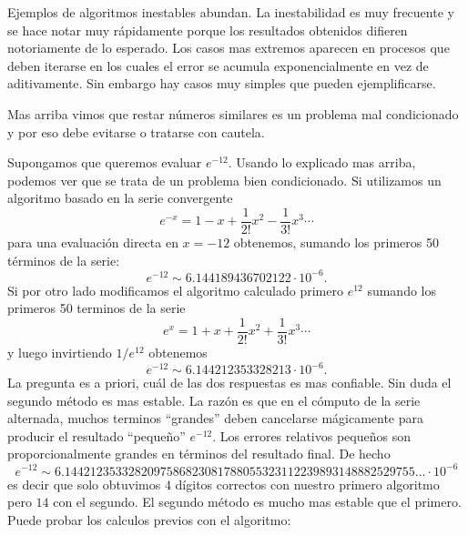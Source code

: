 Ejemplos de algoritmos inestables abundan. La inestabilidad es muy frecuente y se hace notar muy rápidamente porque los resultados obtenidos difieren notoriamente de lo esperado. Los casos mas extremos aparecen en procesos que deben iterarse en los cuales el error se acumula exponencialmente en vez de aditivamente. Sin embargo hay casos muy simples que pueden ejemplificarse.


Mas arriba vimos que restar números similares es un problema mal condicionado y por eso debe evitarse o tratarse con cautela.

Supongamos que queremos evaluar $e^{-12}$. Usando lo explicado mas arriba, podemos ver que se trata de un problema bien condicionado.  Si utilizamos un algoritmo basado en la serie convergente
$$
e^{-x}=1-x+\frac{1}{2!}x^2-\frac{1}{3!}x^3\cdots
$$
para una evaluación directa en $x=-12$ obtenemos, sumando los primeros 50 términos de la serie:
$$
e^{-12}\sim 6.144189436702122\cdot 10^{-6}.$$
Si por otro lado modificamos el algoritmo calculado primero $e^{12}$
sumando los primeros 50 terminos de la serie
$$
e^{x}=1+x+\frac{1}{2!}x^2+\frac{1}{3!}x^3\cdots
$$
y luego invirtiendo $1/e^{12}$ obtenemos
$$e^{-12}\sim 6.144212353328213\cdot 10^{-6}.$$
La pregunta es a priori, cuál de las dos respuestas es mas confiable. Sin duda el segundo método es mas estable. La razón es que en el cómputo de la serie alternada, muchos terminos ``grandes'' deben cancelarse mágicamente para producir el resultado ``pequeño'' $e^{-12}$. Los errores relativos pequeños son proporcionalmente grandes en términos del resultado final. De hecho
$$e^{-12}\sim 6.1442123533282097586823081788055323112239893148882529755...\cdot 10^{-6}$$
es decir que solo obtuvimos $4$ dígitos correctos con nuestro primero algoritmo pero $14$ con el segundo.
El segundo método es mucho mas estable que el primero. Puede probar los calculos previos con el algoritmo:

